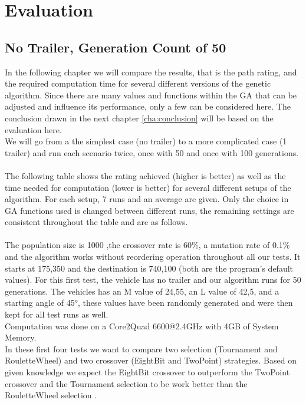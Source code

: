 \chapter{Evaluation}
\label{cha:evaluation}

\section{No Trailer, Generation Count of 50}
\label{sec:no_trailer_50}

In the following chapter we will compare the results, that is the path rating, and the required computation time for several different versions of the genetic algorithm.
Since there are many values and functions within the GA that can be adjusted and influence its performance, only a few can be considered here. The conclusion drawn in the next chapter \ref{cha:conclusion} will be based on the evaluation here.\\
We will go from a the simplest case (no trailer) to a more complicated case (1 trailer) and run each scenario twice, once with 50 and once with 100 generations.\\
\\
The following table shows the rating achieved (higher is better) as well as the time needed for computation (lower is better) for several different setups of the algorithm. For each setup, 7 runs and an average are given. Only the choice in GA functions used is changed between different runs, the remaining settings are consistent throughout the table and are as follows.\\
\\
The population size is 1000 ,the crossover rate is 60\%, a mutation rate of 0.1\% and the algorithm works without reordering operation throughout all our tests. It starts at 175,350 and the destination is 740,100 (both are the program's default values). For this first test, the vehicle has no trailer and our algorithm runs for 50 generations. The vehicles has an M value of 24,55, an L value of 42,5, and a starting angle of 45°, these values have been randomly generated and were then kept for all test runs as well.\\
Computation was done on a Core2Quad 6600@2.4GHz with 4GB of System Memory.\\
In these first four tests we want to compare two selection (Tournament and RouletteWheel) and two crossover (EightBit and TwoPoint) strategies. Based on given knowledge we expect the EightBit crossover to outperform the TwoPoint crossover and the Tournament selection to be work better than the RouletteWheel selection \cite{16}.

